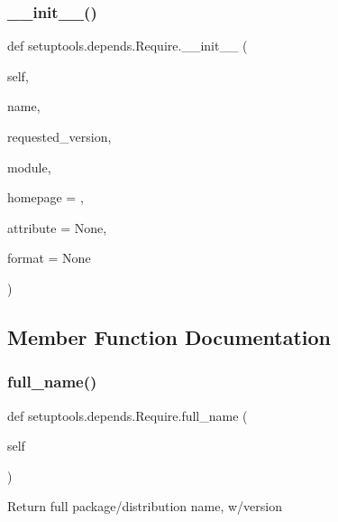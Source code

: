 \subsubsection{\texorpdfstring{\+\_\+\+\_\+init\+\_\+\+\_\+()}{\_\_init\_\_()}}
{\footnotesize\ttfamily def setuptools.\+depends.\+Require.\+\_\+\+\_\+init\+\_\+\+\_\+ (\begin{DoxyParamCaption}\item[{}]{self,  }\item[{}]{name,  }\item[{}]{requested\+\_\+version,  }\item[{}]{module,  }\item[{}]{homepage = {\ttfamily \textquotesingle{}\textquotesingle{}},  }\item[{}]{attribute = {\ttfamily None},  }\item[{}]{format = {\ttfamily None} }\end{DoxyParamCaption})}



\subsection{Member Function Documentation}
\mbox{\label{classsetuptools_1_1depends_1_1Require_aafeb6a0853fe7b53c649a90b4860aa1b}} 
\subsubsection{\texorpdfstring{full\+\_\+name()}{full\_name()}}
{\footnotesize\ttfamily def setuptools.\+depends.\+Require.\+full\+\_\+name (\begin{DoxyParamCaption}\item[{}]{self }\end{DoxyParamCaption})}

\begin{DoxyVerb}Return full package/distribution name, w/version\end{DoxyVerb}
 \mbox{\label{classsetuptools_1_1depends_1_1Require_aa726406933884cdfc0a0a13b01920734}} 
